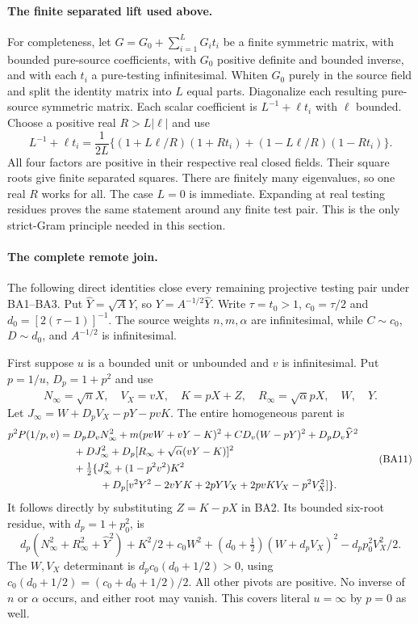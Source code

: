 \paragraph{The finite separated lift used above.}
For completeness, let $G=G_0+\sum_{i=1}^L G_i t_i$ be a finite
symmetric matrix, with bounded pure-source coefficients, with
$G_0$ positive definite and bounded inverse, and with each $t_i$
a pure-testing infinitesimal. Whiten $G_0$ purely in the source
field and split the identity matrix into $L$ equal parts. Diagonalize
each resulting pure-source symmetric matrix. Each scalar coefficient
is $L^{-1}+\ell t_i$ with $\ell$ bounded. Choose a positive real
$R>L|\ell|$ and use
\[
 L^{-1}+\ell t_i=\frac1{2L}
 \{(1+L\ell/R)(1+Rt_i)+(1-L\ell/R)(1-Rt_i)\}.
\]
All four factors are positive in their respective real closed fields.
Their square roots give finite separated squares. There are finitely
many eigenvalues, so one real $R$ works for all. The case $L=0$
is immediate. Expanding at real testing residues proves the same
statement around any finite test pair. This is the only strict-Gram
principle needed in this section.

\paragraph{The complete remote join.}
The following direct identities close every remaining projective
testing pair under BA1--BA3. Put $\widehat Y=\sqrt A Y$, so
$Y=A^{-1/2}\widehat Y$. Write $\tau=t_0>1$,
$c_0=\tau/2$ and $d_0=[2(\tau-1)]^{-1}$. The source weights
$n,m,\alpha$ are infinitesimal, while $C\sim c_0$, $D\sim d_0$,
and $A^{-1/2}$ is infinitesimal.

First suppose $u$ is a bounded unit or unbounded and $v$ is
infinitesimal. Put $p=1/u$, $D_p=1+p^2$ and use
\[
 N_\infty=\sqrt n X,\quad V_X=vX,\quad K=pX+Z,\quad
 R_\infty=\sqrt\alpha pX,\quad W,\quad\widehat Y.
\]
Let $J_\infty=W+D_pV_X-pY-pvK$. The entire homogeneous parent is
\[
 \begin{split}
 p^2P(1/p,v)={}&D_pD_vN_\infty^2+m(pvW+vY-K)^2
 +CD_v(W-pY)^2+D_pD_v\widehat Y^2\\
 &+DJ_\infty^2+D_p[R_\infty+\sqrt\alpha(vY-K)]^2\\
 &+\tfrac12\{J_\infty^2+(1-p^2v^2)K^2\\
 &\hspace{9mm}+D_p[v^2Y^2-2vYK+2pYV_X+2pvKV_X-p^2V_X^2]\}.
 \end{split}                                                       \tag{BA11}
\]
It follows directly by substituting $Z=K-pX$ in BA2. Its bounded
six-root residue, with $d_p=1+p_0^2$, is
\[
 d_p(N_\infty^2+R_\infty^2+\widehat Y^2)+K^2/2
 +c_0W^2+(d_0+\tfrac12)(W+d_pV_X)^2-d_pp_0^2V_X^2/2.
\]
The $W,V_X$ determinant is $d_pc_0(d_0+1/2)>0$, using
$c_0(d_0+1/2)=(c_0+d_0+1/2)/2$. All other pivots are positive.
No inverse of $n$ or $\alpha$ occurs, and either root may vanish.
This covers literal $u=\infty$ by $p=0$ as well.


